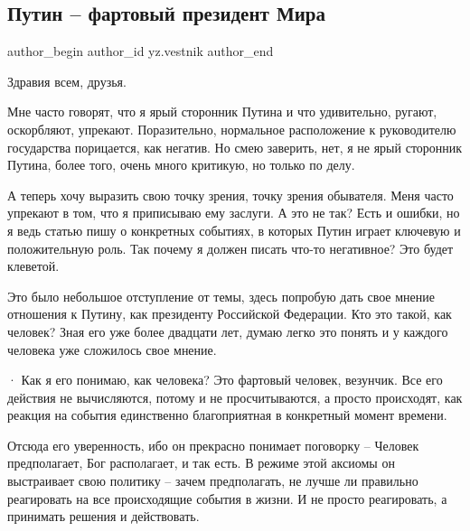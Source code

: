  
 
 
 
 
 
\subsection{Путин – фартовый президент Мира}
\label{sec:13_02_2022.yz.vestnik.1.putin_fartovyj_prezident_mira}
 
\ifcmt
 author_begin
   author_id yz.vestnik
 author_end
\fi

Здравия всем, друзья.

Мне часто говорят, что я ярый сторонник Путина и что удивительно, ругают,
оскорбляют, упрекают. Поразительно, нормальное расположение к руководителю
государства порицается, как негатив. Но смею заверить, нет, я не ярый сторонник
Путина, более того, очень много критикую, но только по делу.


А теперь хочу выразить свою точку зрения, точку зрения обывателя. Меня часто
упрекают в том, что я приписываю ему заслуги. А это не так? Есть и ошибки, но я
ведь статью пишу о конкретных событиях, в которых Путин играет ключевую и
положительную роль. Так почему я должен писать что-то негативное? Это будет
клеветой.

Это было небольшое отступление от темы, здесь попробую дать свое мнение
отношения к Путину, как президенту Российской Федерации. Кто это такой, как
человек? Зная его уже более двадцати лет, думаю легко это понять и у каждого
человека уже сложилось свое мнение.

· Как я его понимаю, как человека? Это фартовый человек, везунчик. Все его
действия не вычисляются, потому и не просчитываются, а просто происходят, как
реакция на события единственно благоприятная в конкретный момент времени.

Отсюда его уверенность, ибо он прекрасно понимает поговорку – Человек
предполагает, Бог располагает, и так есть. В режиме этой аксиомы он выстраивает
свою политику – зачем предполагать, не лучше ли правильно реагировать на все
происходящие события в жизни. И не просто реагировать, а принимать решения и
действовать.

